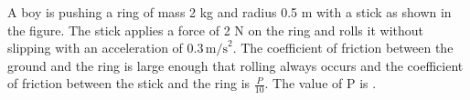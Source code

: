 
\item A boy is pushing a ring of mass 2 kg and radius 0.5 m with a stick as shown in the figure. The stick applies a force of 2 N on the ring and rolls it without slipping with an acceleration of \(0.3 \, \text{m/s}^2\). The coefficient of friction between the ground and the ring is large enough that rolling always occurs and the coefficient of friction between the stick and the ring is \(\frac{P}{10}\). The value of P is \underline{\hspace{2.5cm}}.
    \begin{center}
    \end{center}
